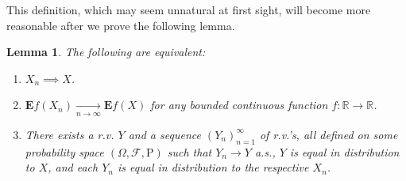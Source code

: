 \documentclass[11pt]{report}
\providecommand{\cal}{\mathcal}
\newcommand{\R}{\mathbb{R}}
\theoremstyle{plain}
\newtheorem{lem}[thm]{Lemma}
\theoremstyle{definition}
\begin{document}
\noindent This definition, which may seem unnatural at first
sight, will become more reasonable after we prove the
following lemma.

\begin{lem}
The following are equivalent:

\begin{enumerate}[label=\arabic*.]
\item $X_n \implies X$.

\item $\mathbf{E} f(X_n) \xrightarrow[n\to\infty]{}
\mathbf{E} f(X)$
for any bounded continuous function $f:\R\to\R$.

\item There exists a r.v. $Y$ and a sequence
$(Y_n)_{n=1}^\infty$ of r.v.'s, all defined on some
probability space $(\Omega, {\cal F}, \mathrm{P})$
such that $Y_n \to Y$ a.s., $Y$ is equal in
distribution to $X$, and each $Y_n$ is equal in
distribution to the respective $X_n$.
\end{enumerate}

\end{lem}
\end{document}
